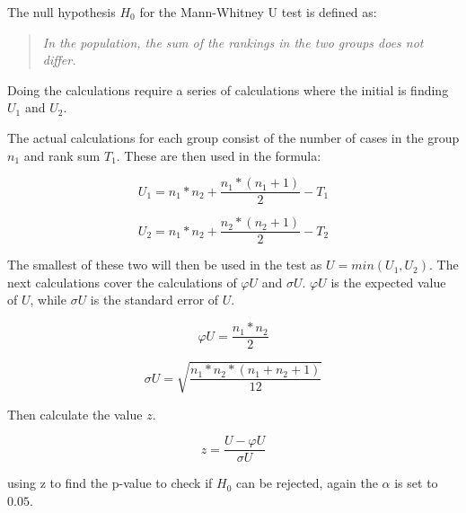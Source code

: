 The null hypothesis $H_0$ for the Mann-Whitney U test is defined as:

\begin{quote}
    \textit{In the population, the sum of the rankings in the two groups does not differ.}
\end{quote}

Doing the calculations require a series of calculations where the initial is finding $U_1$ and $U_2$.

The actual calculations for each group consist of the number of cases in the group $n_1$ and rank sum $T_1$. These are then used in the formula:

\begin{equation}
    U_1 = n_1*n_2+\frac{n_1*(n_1+1)}{2}-T_1  
\end{equation}

\begin{equation}
    U_2 = n_1*n_2+\frac{n_2*(n_2+1)}{2}-T_2
\end{equation}

The smallest of these two will then be used in the test as $U=min(U_1,U_2)$. The next calculations cover the calculations of $\varphi U$ and $\sigma U$. $\varphi U$ is the expected value of $U$, while $\sigma U$ is the standard error of $U$.

\begin{equation}
    \varphi U = \frac{n_1*n_2}{2}
\end{equation}

\begin{equation}
    \sigma U = \sqrt{\frac{n_1*n_2*(n_1+n_2+1)}{12}}
\end{equation}

Then calculate the value $z$.

\begin{equation}
    z = \frac{U-\varphi U}{\sigma U}
\end{equation}

using z to find the p-value to check if $H_0$ can be rejected, again the $\alpha$ is set to $0.05$. 

